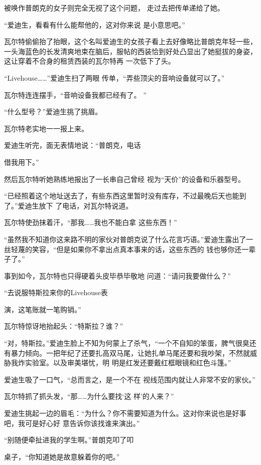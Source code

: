 \documentclass{article}
\begin{document}
被唤作普朗克的女子则完全无视了这个问题，
走过去把传单递给了她。 

\newpage

“爱迪生，看看有什么能帮他的，这对你来说
是小意思吧。” 

瓦尔特偷偷抬了抬眼，这个名叫爱迪生的女孩子看上去好像略比普朗克年轻一些，一头海蓝色的长发清爽地束在脑后，服帖的西装恰到好处凸显出了她挺拔的身姿，这让穿着不合身的租赁西装的瓦尔特再
一次低下了头。 

“Livehouse……”爱迪生扫了两眼
传单，“弄些顶尖的音响设备就可以了。” 

瓦尔特连连摆手，“音响设备我都已经有了。
” 


“什么型号？”爱迪生挑了挑眉。 


瓦尔特老实地一一报上来。 

爱迪生听完，面无表情地说：“普朗克，电话

\newpage
借我用下。” 

然后瓦尔特听她熟练地报出了一长串自己曾经
视为“天价”的设备和乐器型号。 

“已经照着这个地址送去了，有些东西这里暂时没有库存，不过最晚后天也能到了。”爱迪生放下
了电话，对瓦尔特说道。 

瓦尔特使劲抹着汗，“那我……我也不能白拿
这些东西！” 

“虽然我不知道你这来路不明的家伙对普朗克说了什么花言巧语。”爱迪生露出了一丝轻蔑的笑容，“但是如果你不拿出点真本事来的话，这些东西的
钱也够你还一辈子了。” 

事到如今，瓦尔特也只得硬着头皮毕恭毕敬地
问道：“请问我要做什么？” 

“去说服特斯拉来你的Livehouse表

\newpage
演，这笔账就一笔购销。” 


瓦尔特惊讶地抬起头：“特斯拉？谁？” 

“对，特斯拉。”爱迪生脸上不知为何蒙上了杀气，“一个不自知的笨蛋，脾气很臭还有暴力倾向。一把年纪了还要扎高双马尾，让她扎单马尾还要和我吵架，不然就威胁我炸实验室。以及审美堪忧，明
明是红发还要戴红框眼镜和红色斗篷。” 

爱迪生吸了一口气，“总而言之，是一个不在
视线范围内就让人非常不安的家伙。” 

瓦尔特抓了抓头发，“那……为什么要找‘这
样’的人来？” 

爱迪生挑起一边的眉毛：“为什么？你不需要知道为什么。这对你来说也是好事吧，我可是好心好
意告诉你该找谁来演出。” 

“别随便牵扯进我的学生啊。”普朗克叩了叩

\newpage
桌子，“你知道她是故意躲着你的吧。” 
\end{document}

